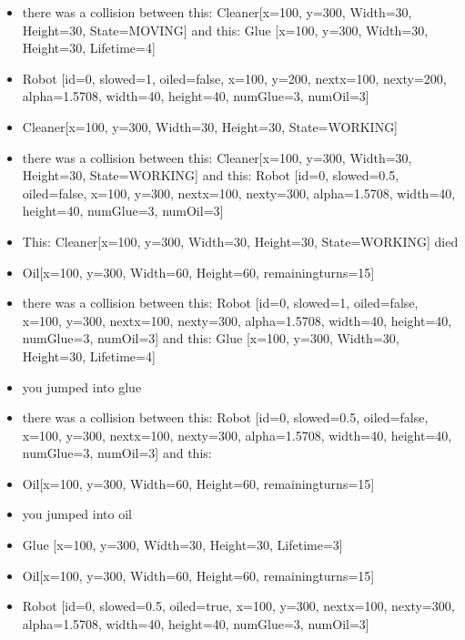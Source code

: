 \begin{itemize}
\begin{itemize}
\item there was a collision between this: Cleaner[x=100, y=300, Width=30, Height=30, State=MOVING] and this: Glue [x=100, y=300, Width=30, Height=30, Lifetime=4]\\
\item Robot [id=0, slowed=1, oiled=false, x=100, y=200, nextx=100, nexty=200, alpha=1.5708, width=40, height=40, numGlue=3, numOil=3]
\item Cleaner[x=100, y=300, Width=30, Height=30, State=WORKING]
\item there was a collision between this: Cleaner[x=100, y=300, Width=30, Height=30, State=WORKING] and this: Robot [id=0, slowed=0.5, oiled=false, x=100, y=300, nextx=100, nexty=300, alpha=1.5708, width=40, height=40, numGlue=3, numOil=3]
\item This: Cleaner[x=100, y=300, Width=30, Height=30, State=WORKING] died
\item Oil[x=100, y=300, Width=60, Height=60, remainingturns=15]
\item there was a collision between this: Robot [id=0, slowed=1, oiled=false, x=100, y=300, nextx=100, nexty=300, alpha=1.5708, width=40, height=40, numGlue=3, numOil=3] and this: Glue [x=100, y=300, Width=30, Height=30, Lifetime=4]
\item you jumped into glue
\item there was a collision between this: Robot [id=0, slowed=0.5, oiled=false, x=100, y=300, nextx=100, nexty=300, alpha=1.5708, width=40, height=40, numGlue=3, numOil=3] and this: 
\item Oil[x=100, y=300, Width=60, Height=60, remainingturns=15]
\item you jumped into oil
\item Glue [x=100, y=300, Width=30, Height=30, Lifetime=3]
\item Oil[x=100, y=300, Width=60, Height=60, remainingturns=15]
\item Robot [id=0, slowed=0.5, oiled=true, x=100, y=300, nextx=100, nexty=300, alpha=1.5708, width=40, height=40, numGlue=3, numOil=3]
\end{itemize}
\end{itemize}

